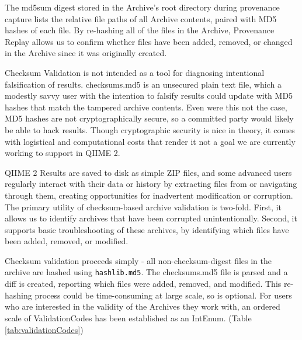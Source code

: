 The md5sum digest stored in the Archive’s root directory during provenance
capture lists the relative file paths of all Archive contents, paired with MD5
hashes of each file.  By re-hashing all of the files in the Archive, Provenance
Replay allows us to confirm whether files have been added, removed, or changed
in the Archive since it was originally created. 

Checksum Validation is not intended as a tool for diagnosing intentional
falsification of results. checksums.md5 is an unsecured plain text file, which a
modestly savvy user with the intention to falsify results could update with MD5
hashes that match the tampered archive contents. Even were this not the case,
MD5 hashes are not cryptographically secure, so a committed party would likely
be able to hack results. Though cryptographic security is nice in theory, it
comes with logistical and computational costs that render it not a goal we are
currently working to support in QIIME 2.

QIIME 2 Results are saved to disk as simple ZIP files, and some advanced users
regularly interact with their data or history by extracting files from or
navigating through them, creating opportunities for inadvertent modification or
corruption. The primary utility of checksum-based archive validation is
two-fold. First, it allows us to identify archives that have been corrupted
unintentionally. Second, it supports basic troubleshooting of these archives, by
identifying which files have been added, removed, or modified. 

Checksum validation proceeds simply - all non-checksum-digest files in the
archive are hashed using \texttt{hashlib.md5}. The checksums.md5 file is parsed and a
diff is created, reporting which files were added, removed, and modified. This
re-hashing process could be time-consuming at large scale, so is optional. For
users who are interested in the validity of the Archives they work with, an
ordered scale of ValidationCodes has been established as an IntEnum. (Table \ref{tab:validationCodes})


